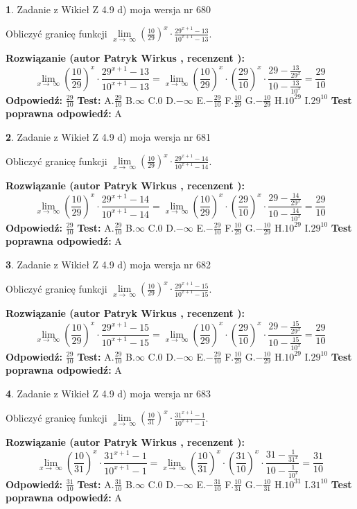 \documentclass[12pt, a4paper]{article}
\theoremstyle{definition} %
\newtheorem{zad}{}
\newcommand{\zadStart}[1]{\begin{zad}#1\newline}
\newcommand{\zadStop}{\end{zad}}
\newcommand{\rozwStart}[2]{\noindent \textbf{Rozwiązanie (autor #1 , recenzent #2): }\newline}
\newcommand{\rozwStop}{\newline}
\newcommand{\odpStart}{\noindent \textbf{Odpowiedź:}\newline}
\newcommand{\odpStop}{\newline}
\newcommand{\testStart}{\noindent \textbf{Test:}\newline}
\newcommand{\testStop}{\newline}
\newcommand{\kluczStart}{\noindent \textbf{Test poprawna odpowiedź:}\newline}
\newcommand{\kluczStop}{\newline}
\begin{document}
\zadStart{Zadanie z Wikieł Z 4.9 d) moja wersja nr 680}


Obliczyć granicę funkcji  $\lim\limits_{x\to\ \infty}(\frac{10}{29})^{x}\cdot\frac{29^{x+1}-13}{10^{x+1}-13}$.
\zadStop
\rozwStart{Patryk Wirkus}{}
$$\lim\limits_{x\to\ \infty}(\frac{10}{29})^{x}\cdot\frac{29^{x+1}-13}{10^{x+1}-13}=\lim\limits_{x\to\ \infty}(\frac{10}{29})^{x}\cdot(\frac{29}{10})^{x} \cdot \frac{29-\frac{13}{29^{x}}}{10-\frac{13}{10^{x}}} = \frac{29}{10}$$
\rozwStop
\odpStart
$\frac{29}{10}$
\odpStop
\testStart
A.$\frac{29}{10}$ B.$\infty$ C.$0$ D.$-\infty$ E.$-\frac{29}{10}$
F.$\frac{10}{29}$ G.$-\frac{10}{29}$
H.$10^{29}$
I.$29^{10}$
\testStop
\kluczStart
A
\kluczStop



\zadStart{Zadanie z Wikieł Z 4.9 d) moja wersja nr 681}


Obliczyć granicę funkcji  $\lim\limits_{x\to\ \infty}(\frac{10}{29})^{x}\cdot\frac{29^{x+1}-14}{10^{x+1}-14}$.
\zadStop
\rozwStart{Patryk Wirkus}{}
$$\lim\limits_{x\to\ \infty}(\frac{10}{29})^{x}\cdot\frac{29^{x+1}-14}{10^{x+1}-14}=\lim\limits_{x\to\ \infty}(\frac{10}{29})^{x}\cdot(\frac{29}{10})^{x} \cdot \frac{29-\frac{14}{29^{x}}}{10-\frac{14}{10^{x}}} = \frac{29}{10}$$
\rozwStop
\odpStart
$\frac{29}{10}$
\odpStop
\testStart
A.$\frac{29}{10}$ B.$\infty$ C.$0$ D.$-\infty$ E.$-\frac{29}{10}$
F.$\frac{10}{29}$ G.$-\frac{10}{29}$
H.$10^{29}$
I.$29^{10}$
\testStop
\kluczStart
A
\kluczStop



\zadStart{Zadanie z Wikieł Z 4.9 d) moja wersja nr 682}


Obliczyć granicę funkcji  $\lim\limits_{x\to\ \infty}(\frac{10}{29})^{x}\cdot\frac{29^{x+1}-15}{10^{x+1}-15}$.
\zadStop
\rozwStart{Patryk Wirkus}{}
$$\lim\limits_{x\to\ \infty}(\frac{10}{29})^{x}\cdot\frac{29^{x+1}-15}{10^{x+1}-15}=\lim\limits_{x\to\ \infty}(\frac{10}{29})^{x}\cdot(\frac{29}{10})^{x} \cdot \frac{29-\frac{15}{29^{x}}}{10-\frac{15}{10^{x}}} = \frac{29}{10}$$
\rozwStop
\odpStart
$\frac{29}{10}$
\odpStop
\testStart
A.$\frac{29}{10}$ B.$\infty$ C.$0$ D.$-\infty$ E.$-\frac{29}{10}$
F.$\frac{10}{29}$ G.$-\frac{10}{29}$
H.$10^{29}$
I.$29^{10}$
\testStop
\kluczStart
A
\kluczStop



\zadStart{Zadanie z Wikieł Z 4.9 d) moja wersja nr 683}


Obliczyć granicę funkcji  $\lim\limits_{x\to\ \infty}(\frac{10}{31})^{x}\cdot\frac{31^{x+1}-1}{10^{x+1}-1}$.
\zadStop
\rozwStart{Patryk Wirkus}{}
$$\lim\limits_{x\to\ \infty}(\frac{10}{31})^{x}\cdot\frac{31^{x+1}-1}{10^{x+1}-1}=\lim\limits_{x\to\ \infty}(\frac{10}{31})^{x}\cdot(\frac{31}{10})^{x} \cdot \frac{31-\frac{1}{31^{x}}}{10-\frac{1}{10^{x}}} = \frac{31}{10}$$
\rozwStop
\odpStart
$\frac{31}{10}$
\odpStop
\testStart
A.$\frac{31}{10}$ B.$\infty$ C.$0$ D.$-\infty$ E.$-\frac{31}{10}$
F.$\frac{10}{31}$ G.$-\frac{10}{31}$
H.$10^{31}$
I.$31^{10}$
\testStop
\kluczStart
A
\kluczStop
\end{document}
